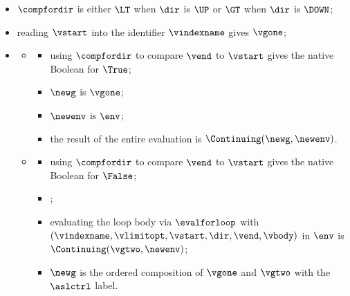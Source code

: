 \AllApply
\begin{itemize}
  \item $\compfordir$ is either $\LT$ when $\dir$ is $\UP$ or $\GT$ when $\dir$ is $\DOWN$;
  \item reading $\vstart$ into the identifier $\vindexname$ gives $\vgone$;
  \item \OneApplies
    \begin{itemize}
    \item {}
    \begin{itemize}
      \item using $\compfordir$ to compare $\vend$ to $\vstart$ gives the native \\
            Boolean for $\True$;
      \item $\newg$ is $\vgone$;
      \item $\newenv$ is $\env$;
      \item the result of the entire evaluation is $\Continuing(\newg, \newenv)$.
    \end{itemize}
    \item {}
    \begin{itemize}
      \item using $\compfordir$ to compare $\vend$ to $\vstart$ gives the native \\
            Boolean for $\False$;
      \item \Proseticklooplimit{$\vlimitopt$}{$\vnextlimitopt$}\ProseOrError;
      \item evaluating the loop body via $\evalforloop$ with \\ $(\vindexname, \vlimitopt, \vstart, \dir, \vend, \vbody)$
      in $\env$ is \\ $\Continuing(\vgtwo, \newenv)$\ProseOrAbnormalReturning;
      \item $\newg$ is the ordered composition of $\vgone$ and $\vgtwo$ with the $\aslctrl$ label.
    \end{itemize}
  \end{itemize}
\end{itemize}

